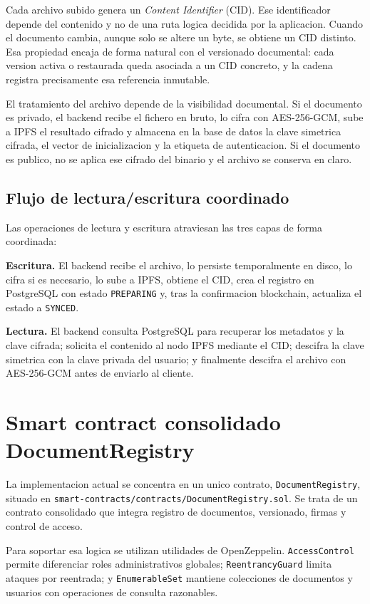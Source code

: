 \documentclass[11pt, a4paper]{article}
\begin{document}
Cada archivo subido genera un \textit{Content Identifier} (CID). Ese identificador depende del contenido y no de una ruta logica decidida por la aplicacion. Cuando el documento cambia, aunque solo se altere un byte, se obtiene un CID distinto. Esa propiedad encaja de forma natural con el versionado documental: cada version activa o restaurada queda asociada a un CID concreto, y la cadena registra precisamente esa referencia inmutable.

El tratamiento del archivo depende de la visibilidad documental. Si el documento es privado, el backend recibe el fichero en bruto, lo cifra con AES-256-GCM, sube a IPFS el resultado cifrado y almacena en la base de datos la clave simetrica cifrada, el vector de inicializacion y la etiqueta de autenticacion. Si el documento es publico, no se aplica ese cifrado del binario y el archivo se conserva en claro.

\subsection{Flujo de lectura/escritura coordinado}

Las operaciones de lectura y escritura atraviesan las tres capas de forma coordinada:

\textbf{Escritura.} El backend recibe el archivo, lo persiste temporalmente en disco, lo cifra si es necesario, lo sube a IPFS, obtiene el CID, crea el registro en PostgreSQL con estado \texttt{PREPARING} y, tras la confirmacion blockchain, actualiza el estado a \texttt{SYNCED}.

\textbf{Lectura.} El backend consulta PostgreSQL para recuperar los metadatos y la clave cifrada; solicita el contenido al nodo IPFS mediante el CID; descifra la clave simetrica con la clave privada del usuario; y finalmente descifra el archivo con AES-256-GCM antes de enviarlo al cliente.

\section{Smart contract consolidado DocumentRegistry}

La implementacion actual se concentra en un unico contrato, \texttt{DocumentRegistry}, situado en \texttt{smart-contracts/contracts/DocumentRegistry.sol}. Se trata de un contrato consolidado que integra registro de documentos, versionado, firmas y control de acceso.

Para soportar esa logica se utilizan utilidades de OpenZeppelin. \texttt{AccessControl} permite diferenciar roles administrativos globales; \texttt{ReentrancyGuard} limita ataques por reentrada; y \texttt{EnumerableSet} mantiene colecciones de documentos y usuarios con operaciones de consulta razonables.
\end{document}
